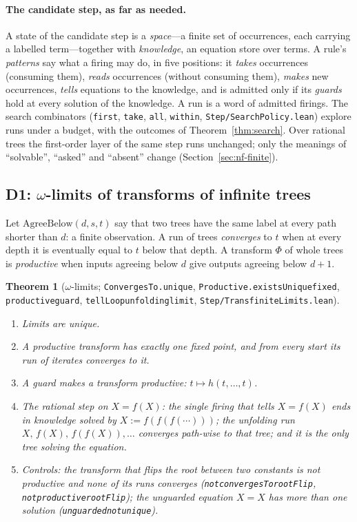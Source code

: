\documentclass[]{article}
\newtheorem{theorem}{Theorem}
\theoremstyle{definition}
\theoremstyle{remark}
\newcommand{\codeus}{\textunderscore\allowbreak}
\newcommand{\code}[1]{\texttt{\let\_\codeus #1}}
\newcommand{\lpath}[1]{{\ttfamily\nolinkurl{#1}}}
\newcommand{\step}[1]{\lpath{Step/#1.lean}}
\begin{document}
\paragraph{The candidate step, as far as needed.} A state of the candidate step is a \emph{space}---a
finite set of occurrences, each carrying a labelled term---together with \emph{knowledge}, an equation
store over terms.
A rule's \emph{patterns} say what a firing may do, in five positions: it \emph{takes} occurrences
(consuming them), \emph{reads} occurrences (without consuming them), \emph{makes} new occurrences,
\emph{tells} equations to the knowledge, and is admitted only if its \emph{guards} hold at every
solution of the knowledge. A run is a word of admitted firings. The search combinators
(\code{first}, \code{take}, \code{all}, \code{within}, \step{SearchPolicy}) explore runs under a
budget, with the outcomes of Theorem~\ref{thm:search}. Over rational trees the first-order layer of
the same step runs unchanged; only the meanings of ``solvable'', ``asked'' and ``absent'' change
(Section~\ref{sec:nf-finite}).

\subsection{\texorpdfstring{D1: $\omega$-limits of transforms of infinite trees}{D1: omega-limits of transforms of infinite trees}}
\label{sec:limits}

Let $\mathrm{AgreeBelow}(d,s,t)$ say that two trees have the same label at every path shorter than $d$:
a finite observation. A run of trees \emph{converges} to $t$ when at every depth it is eventually equal
to $t$ below that depth. A transform $\Phi$ of whole trees is \emph{productive} when inputs agreeing
below $d$ give outputs agreeing below $d+1$.

\begin{theorem}[$\omega$-limits; \code{ConvergesTo.unique}, \code{Productive.existsUnique\_fixed},
\code{productive\_guard}, \code{tellLoop\_unfolding\_limit}, \step{TransfiniteLimits}]
\label{thm:limits}
\leavevmode
\begin{enumerate}
\item Limits are unique.
\item A productive transform has exactly one fixed point, and from every start its run of iterates
  converges to it.
\item A guard makes a transform productive: $t\mapsto h(t,\dots,t)$.
\item \emph{The rational step on $X=f(X)$}: the single firing that tells $X=f(X)$ ends in knowledge
  solved by $X:=f(f(f(\cdots)))$; the unfolding run $X,\,f(X),\,f(f(X)),\dots$ converges path-wise to
  that tree; and it is the only tree solving the equation.
\item \emph{Controls}: the transform that flips the root between two constants is not productive and
  none of its runs converges (\code{not\_convergesTo\_rootFlip}, \code{not\_productive\_rootFlip}); the
  unguarded equation $X=X$ has more than one solution (\code{unguarded\_not\_unique}).
\end{enumerate}
\end{theorem}
\end{document}
